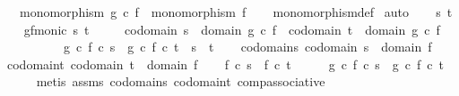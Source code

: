 \begin{isabellebody}
\ \ \ {\isachardoublequoteopen}monomorphism\ {\isacharparenleft}{\kern0pt}g\ {\isasymcirc}\isactrlsub c\ f{\isacharparenright}{\kern0pt}\ {\isasymLongrightarrow}\ monomorphism\ f{\isachardoublequoteclose}\isanewline
%
\isadelimproof
\ \ %
\endisadelimproof
%
\isatagproof
{}\isamarkupfalse%
\ monomorphism{\isacharunderscore}{\kern0pt}def\isanewline
{}\isamarkupfalse%
\ auto\isanewline
\ \ \isamarkupfalse%
\ s\ t\isanewline
\ \ \isamarkupfalse%
\ gf{\isacharunderscore}{\kern0pt}monic{\isacharcolon}{\kern0pt}\ {\isachardoublequoteopen}{\isasymforall}s{\isachardot}{\kern0pt}\ {\isasymforall}t{\isachardot}{\kern0pt}\ \isanewline
\ \ \ \ codomain\ s\ {\isacharequal}{\kern0pt}\ domain\ {\isacharparenleft}{\kern0pt}g\ {\isasymcirc}\isactrlsub c\ f{\isacharparenright}{\kern0pt}\ {\isasymand}\ codomain\ t\ {\isacharequal}{\kern0pt}\ domain\ {\isacharparenleft}{\kern0pt}g\ {\isasymcirc}\isactrlsub c\ f{\isacharparenright}{\kern0pt}\ {\isasymlongrightarrow}\isanewline
\ \ \ \ \ \ \ \ \ \ {\isacharparenleft}{\kern0pt}g\ {\isasymcirc}\isactrlsub c\ f{\isacharparenright}{\kern0pt}\ {\isasymcirc}\isactrlsub c\ s\ {\isacharequal}{\kern0pt}\ {\isacharparenleft}{\kern0pt}g\ {\isasymcirc}\isactrlsub c\ f{\isacharparenright}{\kern0pt}\ {\isasymcirc}\isactrlsub c\ t\ {\isasymlongrightarrow}\ s\ {\isacharequal}{\kern0pt}\ t{\isachardoublequoteclose}\isanewline
\ \ \isamarkupfalse%
\ codomain{\isacharunderscore}{\kern0pt}s{\isacharcolon}{\kern0pt}\ {\isachardoublequoteopen}codomain\ s\ {\isacharequal}{\kern0pt}\ domain\ f{\isachardoublequoteclose}\isanewline
\ \ \isamarkupfalse%
\ codomain{\isacharunderscore}{\kern0pt}t{\isacharcolon}{\kern0pt}\ {\isachardoublequoteopen}codomain\ t\ {\isacharequal}{\kern0pt}\ domain\ f{\isachardoublequoteclose}\isanewline
\ \ \isamarkupfalse%
\ {\isachardoublequoteopen}f\ {\isasymcirc}\isactrlsub c\ s\ {\isacharequal}{\kern0pt}\ f\ {\isasymcirc}\isactrlsub c\ t{\isachardoublequoteclose}\isanewline
\isanewline
\ \ \isamarkupfalse%
\ \isamarkupfalse%
\ {\isachardoublequoteopen}{\isacharparenleft}{\kern0pt}g\ {\isasymcirc}\isactrlsub c\ f{\isacharparenright}{\kern0pt}\ {\isasymcirc}\isactrlsub c\ s\ {\isacharequal}{\kern0pt}\ {\isacharparenleft}{\kern0pt}g\ {\isasymcirc}\isactrlsub c\ f{\isacharparenright}{\kern0pt}\ {\isasymcirc}\isactrlsub c\ t{\isachardoublequoteclose}\isanewline
\ \ \ \ \isamarkupfalse%
\ {\isacharparenleft}{\kern0pt}metis\ assms\ codomain{\isacharunderscore}{\kern0pt}s\ codomain{\isacharunderscore}{\kern0pt}t\ comp{\isacharunderscore}{\kern0pt}associative{\isacharparenright}{\kern0pt}\isanewline

\end{isabellebody}
